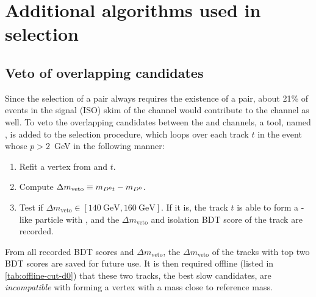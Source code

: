 \section{Additional algorithms used in selection}
\label{ref:sel:algo}


\subsection{Veto of overlapping candidates}
\label{ref:sel:algo:veto}

Since the selection of a \Dstar\muon pair always requires the existence
of a \Dz\muon pair,
about 21\% of events in the signal (ISO) skim of the \Dstar channel
would contribute to the \Dz channel as well.
%
To veto the overlapping candidates between the \Dz and \Dstar channels,
a tool, named ,
is added to the selection procedure, which loops over each track $t$
in the event whose $p > 2$~GeV in the following manner:

\begin{enumerate}
    \item Refit a vertex from \Dz and $t$.
    \item Compute $\Delta m_\text{veto} \equiv m_{{{D}^0} t} - m_{{D}^0}$.
    \item Test if $\Delta m_\text{veto} \in [140~\text{GeV}, 160~\text{GeV}]$.
        If it is, the track $t$ is able to form a \Dstar-like particle with \Dz,
        and the $\Delta m_\text{veto}$ and isolation BDT score
        of the track are recorded.
\end{enumerate}

From all recorded BDT scores and $\Delta m_\text{veto}$, the
$\Delta m_\text{veto}$ of the tracks with top two BDT scores are saved
for future use.
It is then required offline (listed in \cref{tab:offline-cut-d0})
that these two tracks,
the best slow \pion candidates,
are \emph{incompatible} with
forming a \Dz\pion vertex with a mass close to \Dstar reference mass.

